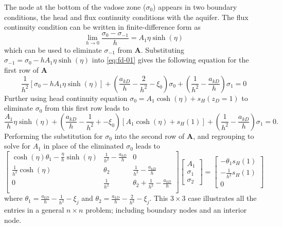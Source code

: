 \documentclass[12pt,letterpaper]{article}
\begin{document}
The node at the bottom of the vadose zone ($\sigma_0$) appears in two
boundary conditions, the head and flux continuity conditions with the
aquifer.  The flux continuity condition can be written in
finite-difference form as
\begin{equation}
 \nonumber
  \lim_{h \rightarrow 0} \frac{\sigma_0 - \sigma_{-1}}{h} = A_1 \eta \sinh(\eta)
\end{equation}
which can be used to eliminate $\sigma_{-1}$ from $\mathbf{A}$.
Substituting $\sigma_{-1} = \sigma_0 - hA_1 \eta \sinh(\eta)$ into
\eqref{eq:fd-01} gives the following equation for the first row of
$\mathbf{A}$
\begin{equation}
  \nonumber
  \frac{1}{h^2} \left[ \sigma_0 - hA_1 \eta \sinh(\eta)\right] +
  \left(\frac{a_{kD}}{h} - \frac{2}{h^2}  - \xi_0\right) \sigma_0
  + \left(\frac{1}{h^2} - \frac{a_{kD}}{h}\right) \sigma_1 = 0
\end{equation}
Further using head continuity equation $\sigma_0 = A_1 \cosh(\eta) +
s_{H}(z_D=1)$ to eliminate $\sigma_0$ from this first row leads to
\begin{equation}
 \nonumber
    \frac{A_1}{h}  \eta \sinh(\eta) +
  \left( \frac{a_{kD}}{h} - \frac{1}{h^2} + - \xi_0\right) \left[
    A_1 \cosh(\eta) + s_{H}(1)\right] + \left(\frac{1}{h^2} -
    \frac{a_{kD}}{h}\right) \sigma_1 = 0.
\end{equation}
Performing the substitution for $\sigma_0$ into the second row of
$\mathbf{A}$, and regrouping to solve for $A_1$ in place of the
eliminated $\sigma_0$ leads to
 \begin{equation}
  \label{eq:fd-02}
  \left[ \begin{matrix}
     \cosh(\eta)\theta_1 - \frac{\eta}{h} \sinh(\eta) &
    \frac{1}{h^2} - \frac{a_{kD}}{h} & 0 \\ 
     \frac{1}{h^2}\cosh(\eta) & \theta_2 &
    \frac{1}{h^2} - \frac{a_{kD}}{h}   \\ 
     0 & \frac{1}{h^2} & \theta_2 +
    \frac{1}{h^2} - \frac{a_{kD}}{h} \\ 
  \end{matrix}\right] 
\left[\begin{matrix}
A_1 \\ \sigma_1 \\ \sigma_2 
\end{matrix}\right]
=
\left[\begin{matrix}
-\theta_1 s_H(1) \\ 
-\frac{1}{h^2}s_H(1) \\ 0 
\end{matrix}\right]
\end{equation}
where $\theta_1 = \frac{a_{kD}}{h} - \frac{1}{h^2} - \xi_j$ and $\theta_2 =
\frac{a_{kD}}{h} - \frac{2}{h^2} - \xi_j $.  This 
$3\times 3$ case illustrates all the entries in a general $n\times
n$ problem; including boundary nodes and an interior node.  
\end{document}
